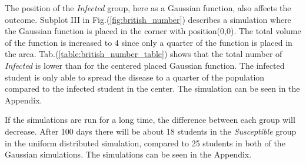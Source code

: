 \documentclass[%
twoside,                 %
final,                   %
chapterprefix=true,      %
open=right               %
10pt]{book}
\begin{document}
\vspace{3mm}




\vspace{3mm}


The position of the \emph{Infected} group, here as a Gaussian function, also affects the outcome. Subplot III in Fig.(\ref{fig:british_number}) describes a simulation where the Gaussian function is placed in the corner with position(0,0). The total volume of the function is increased to 4 since only a quarter of the function is placed in the area. Tab.(\ref{table:british_number_table}) shows that the total number of \emph{Infected} is lower than for the centered placed Gaussian function. The infected student is only able to spread the disease to a quarter of the population compared to the infected student in the center. The simulation can be seen in the Appendix.


\vspace{3mm}




\vspace{3mm}


If the simulations are run for a long time, the difference between each group will decrease. After 100 days there will be about 18 students in the \emph{Susceptible} group in the uniform distributed simulation, compared to 25 students in both of the Gaussian simulations. The simulations can be seen in the Appendix.

\end{document}
